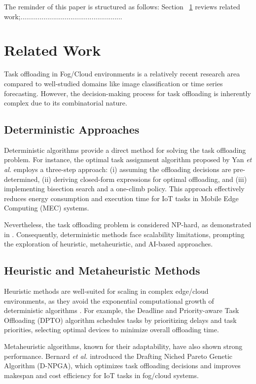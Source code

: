 \documentclass[preprint,12pt]{elsarticle}
\begin{document}
The reminder of this paper is structured as follows: Section ~\ref{sec:Related work} reviews related work;..................................................... 


\section{Related Work}
\label{sec:Related work}




Task offloading in Fog/Cloud environments is a relatively recent research area compared to well-studied domains like image classification or time series forecasting. However, the decision-making process for task offloading is inherently complex due to its combinatorial nature.

\subsection{Deterministic Approaches}
Deterministic algorithms provide a direct method for solving the task offloading problem. For instance, the optimal task assignment algorithm proposed by Yan \textit{et al.} \cite{yan_optimal_2020} employs a three-step approach: (i) assuming the offloading decisions are pre-determined, (ii) deriving closed-form expressions for optimal offloading, and (iii) implementing bisection search and a one-climb policy. This approach effectively reduces energy consumption and execution time for IoT tasks in Mobile Edge Computing (MEC) systems.

Nevertheless, the task offloading problem is considered NP-hard, as demonstrated in \cite{guo_algorithmics_2024, jin_task_2024, sarkar_deep_2022}. Consequently, deterministic methods face scalability limitations, prompting the exploration of heuristic, metaheuristic, and AI-based approaches.

\subsection{Heuristic and Metaheuristic Methods}
Heuristic methods are well-suited for scaling in complex edge/cloud environments, as they avoid the exponential computational growth of deterministic algorithms \cite{zhang_survey_2024}. For example, the Deadline and Priority-aware Task Offloading (DPTO) algorithm \cite{adhikari_dpto_2020} schedules tasks by prioritizing delays and task priorities, selecting optimal devices to minimize overall offloading time.

Metaheuristic algorithms, known for their adaptability, have also shown strong performance. Bernard \textit{et al.} \cite{bernard_d-npga_2024} introduced the Drafting Niched Pareto Genetic Algorithm (D-NPGA), which optimizes task offloading decisions and improves makespan and cost efficiency for IoT tasks in fog/cloud systems.
\end{document}
